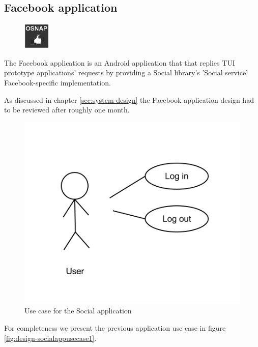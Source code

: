 \subsection{Facebook application} \label{section:service-fb}
\begin{figure}
	\centering \includegraphics[scale=1]{img/app-fb}
\end{figure}
The Facebook application is an Android application that that replies
TUI prototype applications' requests by providing a Social library's 'Social service'
Facebook-specific implementation.

As discussed in chapter \ref{sec:system-design} the Facebook application design had to be reviewed after roughly one month.

\begin{figure}[H]
	\centering \includegraphics[scale=0.35]{img/design-socialappusecase2}
	\caption{Use case for the Social application}
	\label{fig:design-socialappusecase2}
\end{figure}

For completeness we present the previous application use case in figure \ref{fig:design-socialappusecase1}.

